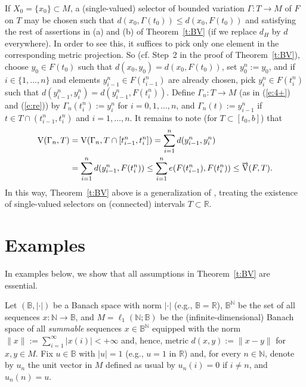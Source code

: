 \documentclass[preprint,12pt]{elsarticle}
\newcommand{\eq}[1]{\mbox{\rm(\ref{#1})}}
\newcommand{\Rb}{\mathbb{R}}  \newcommand{\Nb}{\mathbb{N}}
\newcommand{\nV}{\mbox{\rm V}}
\newcommand{\riV}{{\scriptstyle\overrightarrow{\mbox{\rm V}}}}
\begin{document}
\begin{rem} \label{r:single}
If $X_0=\{x_0\}\subset M$, a (single-valued) selector of bounded var\-i\-a\-tion
$\Gamma:T\!\to\! M$ of $F$ on $T$ may be chosen such that
\mbox{$d(x_0,\Gamma(t_0))\!\le\! d(x_0,F(t_0))$} and satisfying the rest of assertions
in (a) and (b) of Theorem~\ref{t:BV} (if we replace $d_H$ by $d$ everywhere).
In order to see this, it suffices to pick only one element in the corresponding metric
projection. So (cf. Step~2 in the proof of Theorem~\ref{t:BV}),
choose $y_0\in F(t_0)$ such that $d(x_0,y_0)=d(x_0,F(t_0))$, set $y_0^n:=y_0$,
and if $i\in\{1,\dots,n\}$ and elements $y_{i-1}^n\in F(t_{i-1}^n)$ are already chosen,
pick \mbox{$y_i^n\in F(t_i^n)$} such that $d(y_{i-1}^n,y_i^n)=d(y_{i-1}^n,F(t_i^n))$.
Define $\Gamma_n:T\to M$ (as in \eq{e:4+} and \eq{e:re}) by
$\Gamma_n(t_i^n):=y_i^n$ for $i=0,1,\dots,n$, and $\Gamma_n(t):=y_{i-1}^n$
if $t\in T\cap(t_{i-1}^n,t_i^n)$ and $i=1,\dots,n$. It remains to note
(for $T\subset[t_0,b]$) that
  \begin{align*}
\nV(\Gamma_n,T)&=\nV(\Gamma_n,T\cap[t_{i-1}^n,t_i^n])
  =\sum_{i=1}^n d(y_{i-1}^n,y_i^n)\\
&=\sum_{i=1}^n d(y_{i-1}^n,F(t_i^n))\le\sum_{i=1}^n e(F(t_{i-1}^n),F(t_i^n))
  \le\riV(F,T).
  \end{align*}
In this way, Theorem~\ref{t:BV} above is a generalization of \cite[Theorem~1]{JMAA07},
treating the existence of single-valued selectors on (connected) intervals $T\subset\Rb$.
\end{rem}

\section{Examples} \label{s:exa}

In examples below, we show that all assumptions in Theorem~\ref{t:BV}
are essential.

Let $(\mathbb{B},|\cdot|)$ be a Banach space with norm $|\cdot|$ (e.g.,
$\mathbb{B}=\Rb$), $\mathbb{B}^\Nb$ be the set of all sequences
$x:\Nb\to\mathbb{B}$, and $M=\ell_1(\Nb;\mathbb{B})$ be the (infinite-dimensional)
Banach space of all \emph{summable\/} sequences $x\in\mathbb{B}^\Nb$ equipped
with the norm $\|x\|:=\sum_{i=1}^\infty|x(i)|<+\infty$ and, hence, metric
$d(x,y):=\|x-y\|$ for $x,y\in M$. Fix $u\in\mathbb{B}$ with $|u|=1$
(e.g., $u=1$ in $\Rb$) and, for every $n\in\Nb$, denote by $u_n$ the unit vector
in $M$ defined as usual by $u_n(i)=0$ if $i\ne n$, and $u_n(n)=u$.
\end{document}
